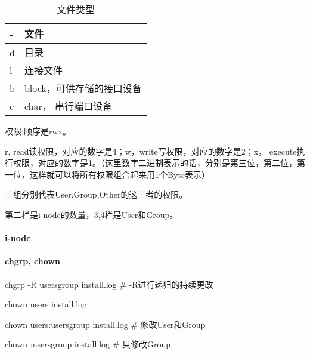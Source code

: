 \begin{table}
\caption{文件类型}    %

\begin{tabular}{|l|l|} 


\hline %
- & 文件\\
\hline
d & 目录\\
\hline
l & 连接文件\\
\hline
b & block，可供存储的接口设备\\
\hline
c & char， 串行端口设备\\
\hline

\end{tabular}


\end{table}

权限:顺序是rwx。
 
r, read读权限，对应的数字是4；w，write写权限，对应的数字是2；x， execute执行权限，对应的数字是1。（这里数字二进制表示的话，分别是第三位，第二位，第一位，这样就可以将所有权限组合起来用1个Byte表示）
 
三组分别代表User,Group,Other的这三者的权限。

第二栏是i-node的数量，3,4栏是User和Group。

\paragraph{i-node}


\paragraph{chgrp, chown}

\begin{Bash}

chgrp -R usersgroup install.log 	# -R进行递归的持续更改

chown users install.log

chown users:usersgroup install.log  # 修改User和Group

chown :usersgroup install.log 		# 只修改Group

\end{Bash}


